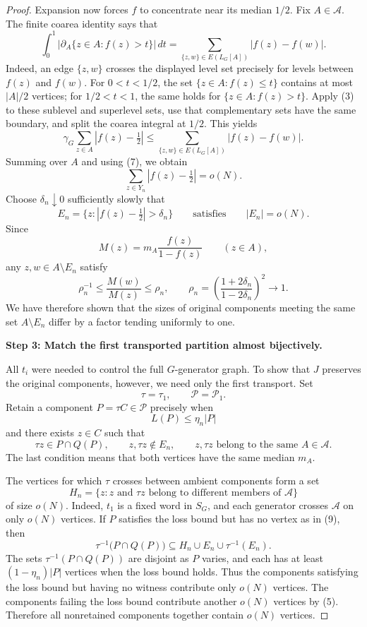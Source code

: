 \documentclass[10pt]{article}
\newcommand{\stephead}[1]{\par\medskip\noindent\textbf{#1}\par\smallskip}
\newcommand{\abs}[1]{\left|#1\right|}
\begin{document}
\begin{proof}
Expansion now forces $f$ to concentrate near its median $1/2$. Fix $A\in\mathcal A$. The finite coarea identity says that
\[
\int_0^1\abs{\partial_A\{z\in A:f(z)>t\}}\,dt
=\sum_{\{z,w\}\in E(L_G[A])}\abs{f(z)-f(w)}.
\]
Indeed, an edge $\{z,w\}$ crosses the displayed level set precisely for levels between $f(z)$ and $f(w)$. For $0<t<1/2$, the set $\{z\in A:f(z)\leq t\}$ contains at most $\abs{A}/2$ vertices; for $1/2<t<1$, the same holds for $\{z\in A:f(z)>t\}$. Apply (3) to these sublevel and superlevel sets, use that complementary sets have the same boundary, and split the coarea integral at $1/2$. This yields
\[
\gamma_G\sum_{z\in A}\abs{f(z)-\tfrac12}
\leq\sum_{\{z,w\}\in E(L_G[A])}\abs{f(z)-f(w)}.
\]
Summing over $A$ and using (7), we obtain
\[
\sum_{z\in Y_n}\abs{f(z)-\tfrac12}=o(N).
\]
Choose $\delta_n\downarrow0$ sufficiently slowly that
\[
E_n=\{z:\abs{f(z)-\tfrac12}>\delta_n\}\qquad\text{satisfies}\qquad\abs{E_n}=o(N).
\]
Since
\[
M(z)=m_A\frac{f(z)}{1-f(z)}\qquad(z\in A),
\]
any $z,w\in A\setminus E_n$ satisfy
\begin{equation}
\rho_n^{-1}\leq\frac{M(w)}{M(z)}\leq\rho_n,
\qquad
\rho_n=\left(\frac{1+2\delta_n}{1-2\delta_n}\right)^2\longrightarrow1.
\tag{8}
\end{equation}
We have therefore shown that the sizes of original components meeting the same set $A\setminus E_n$ differ by a factor tending uniformly to one.

\stephead{Step 3: Match the first transported partition almost bijectively.}
All $t_i$ were needed to control the full $G$-generator graph. To show that $J$ preserves the original components, however, we need only the first transport. Set
\[
\tau=\tau_1,\qquad \mathcal P=\mathcal P_1.
\]
Retain a component $P=\tau C\in\mathcal P$ precisely when
\[
L(P)\leq\eta_n\abs{P}
\]
and there exists $z\in C$ such that
\begin{equation}
\tau z\in P\cap Q(P),\qquad z,\tau z\notin E_n,\qquad z,\tau z\text{ belong to the same }A\in\mathcal A.
\tag{9}
\end{equation}
The last condition means that both vertices have the same median $m_A$.

The vertices for which $\tau$ crosses between ambient components form a set
\[
H_n=\{z:z\text{ and }\tau z\text{ belong to different members of }\mathcal A\}
\]
of size $o(N)$. Indeed, $t_1$ is a fixed word in $S_G$, and each generator crosses $\mathcal A$ on only $o(N)$ vertices. If $P$ satisfies the loss bound but has no vertex as in (9), then
\[
\tau^{-1}\bigl(P\cap Q(P)\bigr)\subseteq H_n\cup E_n\cup\tau^{-1}(E_n).
\]
The sets $\tau^{-1}(P\cap Q(P))$ are disjoint as $P$ varies, and each has at least $(1-\eta_n)\abs{P}$ vertices when the loss bound holds. Thus the components satisfying the loss bound but having no witness contribute only $o(N)$ vertices. The components failing the loss bound contribute another $o(N)$ vertices by (5). Therefore all nonretained components together contain $o(N)$ vertices.


\end{proof}
\end{document}

